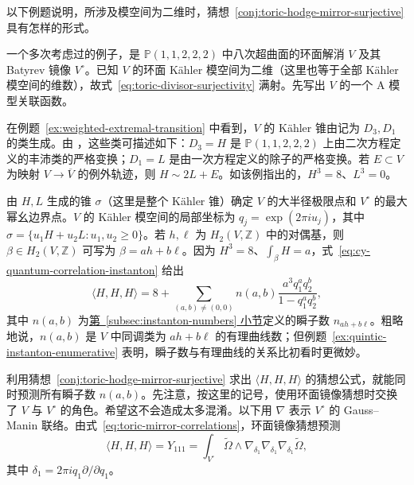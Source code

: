 以下例题说明，所涉及模空间为二维时，猜想~\ref{conj:toric-hodge-mirror-surjective} 具有怎样的形式。
\begin{example}\label{ex:octic-toric-mirror-correlations}
一个多次考虑过的例子，是 $\mathbb P(1,1,2,2,2)$ 中八次超曲面的环面解消 $V$ 及其 Batyrev 镜像 $V^\circ$。已知 $V$ 的环面 Kähler 模空间为二维（这里也等于全部 Kähler 模空间的维数），故式~\eqref{eq:toric-divisor-surjectivity} 满射。先写出 $V$ 的一个 A 模型关联函数。

在例题~\ref{ex:weighted-extremal-transition} 中看到，$V$ 的 Kähler 锥由记为 $D_3,D_1$ 的类生成。由 ，这些类可描述如下：$D_3=H$ 是 $\mathbb P(1,1,2,2,2)$ 上由二次方程定义的丰沛类的严格变换；$D_1=L$ 是由一次方程定义的除子的严格变换。若 $E\subset V$ 为映射 $V\to\overline V$ 的例外轨迹，则 $H\sim2L+E$。如该例指出的，$H^3=8$、$L^3=0$。

由 $H,L$ 生成的锥 $\sigma$（这里是整个 Kähler 锥）确定 $V$ 的大半径极限点和 $V^\circ$ 的最大幂幺边界点。$V$ 的 Kähler 模空间的局部坐标为 $q_j=\exp(2\pi iu_j)$，其中 $\sigma=\{u_1H+u_2L:u_1,u_2\ge0\}$。若 $h,\ell$ 为 $H_2(V,\mathbb Z)$ 中的对偶基，则 $\beta\in H_2(V,\mathbb Z)$ 可写为 $\beta=ah+b\ell$。因为 $H^3=8$、$\int_\beta H=a$，式~\eqref{eq:cy-quantum-correlation-instanton} 给出
\begin{equation}\label{eq:octic-a-model-instants}
\langle H,H,H\rangle=8+\sum_{(a,b)\ne(0,0)}n(a,b)\frac{a^3q_1^aq_2^b}{1-q_1^aq_2^b},
\end{equation}
其中 $n(a,b)$ 为\hyperref[subsec:instanton-numbers]{第~\ref*{subsec:instanton-numbers} 小节}定义的瞬子数 $n_{ah+b\ell}$。粗略地说，$n(a,b)$ 是 $V$ 中同调类为 $ah+b\ell$ 的有理曲线数；但例题~\ref{ex:quintic-instanton-enumerative} 表明，瞬子数与有理曲线的关系比初看时更微妙。

利用猜想~\ref{conj:toric-hodge-mirror-surjective} 求出 $\langle H,H,H\rangle$ 的猜想公式，就能同时预测所有瞬子数 $n(a,b)$。先注意，按这里的记号，使用环面镜像猜想时交换了 $V$ 与 $V^\circ$ 的角色。希望这不会造成太多混淆。以下用 $\nabla$ 表示 $V^\circ$ 的 Gauss--Manin 联络。由式~\eqref{eq:toric-mirror-correlations}，环面镜像猜想预测
\[
\langle H,H,H\rangle=Y_{111}=\int_{V^\circ}\widetilde\Omega\wedge\nabla_{\delta_1}\nabla_{\delta_1}\nabla_{\delta_1}\widetilde\Omega,
\]
其中 $\delta_1=2\pi iq_1\partial/\partial q_1$。


\end{example}
